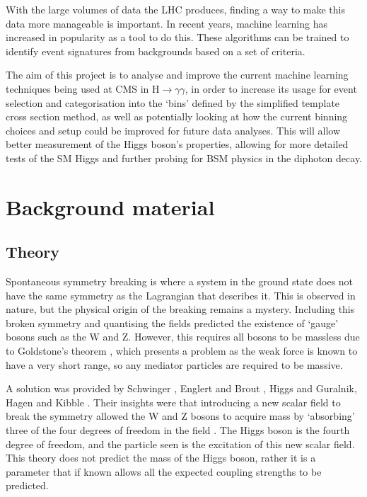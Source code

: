 \documentclass[12pt]{article}
\begin{document}
With the large volumes of data the LHC produces, finding a way to make this data more manageable is important. In recent years, machine learning has increased in popularity as a tool to do this. These algorithms can be trained to identify event signatures from backgrounds based on a set of criteria. 

The aim of this project is to analyse and improve the current machine learning techniques being used at CMS in H$\rightarrow \gamma\gamma$, in order to increase its usage for event selection and categorisation into the `bins' defined by the simplified template cross section method, as well as potentially looking at how the current binning choices and setup could be improved for future data analyses. This will allow better measurement of the Higgs boson's properties, allowing for more detailed tests of the SM Higgs and further probing for BSM physics in the diphoton decay. 

\section*{Background material}

\subsection*{Theory}

Spontaneous symmetry breaking is where a system in the ground state does not have the same symmetry as the Lagrangian that describes it. This is observed in nature, but the physical origin of the breaking remains a mystery. Including this broken symmetry and quantising the fields predicted the existence of `gauge' bosons such as the W and Z. However, this requires all bosons to be massless due to Goldstone's theorem \cite{higgstheory}, which presents a problem as the weak force is known to have a very short range, so any mediator particles are required to be massive.

A solution was provided by Schwinger \cite{theory1}, Englert and Brout \cite{theory2}, Higgs \cite{higgstheory} and Guralnik, Hagen and Kibble \cite{theory3}. Their insights were that introducing a new scalar field to break the symmetry allowed the W and Z bosons to acquire mass by `absorbing' three of the four degrees of freedom in the field \cite{theory4}. The Higgs boson is the fourth degree of freedom, and the particle seen is the excitation of this new scalar field. This theory does not predict the mass of the Higgs boson, rather it is a parameter that if known allows all the expected coupling strengths to be predicted. 
\end{document}
